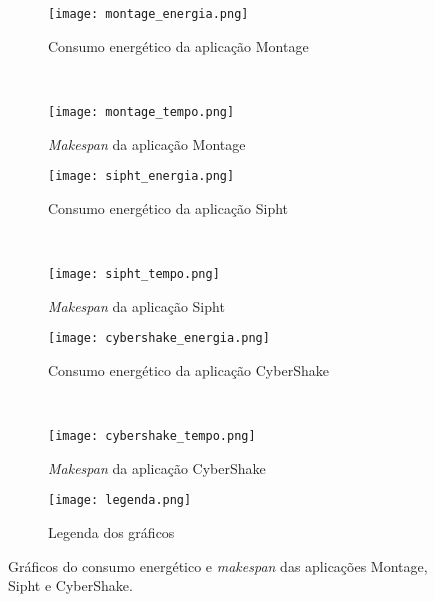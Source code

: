 \begin{figure}
        \centering
        \begin{subfigure}[b]{0.5\textwidth}
                \texttt{[image: montage\_energia.png]}
                \caption{Consumo energético da aplicação Montage}
                \label{fig:montage_energia}
        \end{subfigure}%
        ~ %
        \begin{subfigure}[b]{0.5\textwidth}
                \texttt{[image: montage\_tempo.png]}
                \caption{\emph{Makespan} da aplicação Montage}
                \label{fig:montage_tempo}
        \end{subfigure}

        \begin{subfigure}[b]{0.5\textwidth}
                \texttt{[image: sipht\_energia.png]}
                \caption{Consumo energético da aplicação Sipht}
                \label{fig:sipht_energia}
        \end{subfigure}%
        ~ %
        \begin{subfigure}[b]{0.5\textwidth}
                \texttt{[image: sipht\_tempo.png]}
                \caption{\emph{Makespan} da aplicação Sipht}
                \label{fig:sipht_tempo}
        \end{subfigure}

        \begin{subfigure}[b]{0.5\textwidth}
                \texttt{[image: cybershake\_energia.png]}
                \caption{Consumo energético da aplicação CyberShake}
                \label{fig:cybershake_energia}
        \end{subfigure}%
        ~ %
        \begin{subfigure}[b]{0.5\textwidth}
                \texttt{[image: cybershake\_tempo.png]}
                \caption{\emph{Makespan} da aplicação CyberShake}
                \label{fig:cybershake_tempo}
        \end{subfigure}

        \begin{subfigure}[b]{0.25\textwidth}
                \texttt{[image: legenda.png]}
                \caption{Legenda dos gráficos}
                \label{fig:legenda_graficos}
        \end{subfigure}%
        \caption{Gráficos do consumo energético e \emph{makespan} das aplicações
        Montage, Sipht e CyberShake.}\label{fig:graficos_aplicacoes}
\end{figure}


